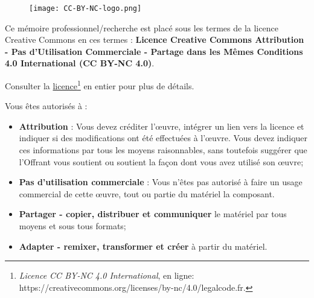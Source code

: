         \begin{figure}[H]
            \centering
            \texttt{[image: CC-BY-NC-logo.png]}
            \label{traitement}
        \end{figure}

    Ce mémoire professionnel/recherche est placé sous les termes de la licence Creative Commons en ces termes : \textbf{Licence Creative Commons Attribution - Pas d'Utilisation Commerciale - Partage dans les Mêmes Conditions 4.0 International (CC BY-NC 4.0)}.
\bigskip

    Consulter la \href{https://creativecommons.org/licenses/by-nc-sa/4.0/legalcode.fr}{licence\footnote{
\textit{Licence CC BY-NC 4.0 International}, en ligne: \url{https://creativecommons.org/licenses/by-nc/4.0/legalcode.fr}.}} en entier pour plus de détails. 
\bigskip

    Vous êtes autorisés à :
    \begin{itemize}
        \item \textbf{Attribution} : Vous devez créditer l'\oe uvre, intégrer un lien vers la licence et indiquer si des modifications ont été effectuées à l'\oe uvre. Vous devez indiquer ces informations par tous les moyens raisonnables, sans toutefois suggérer que l'Offrant vous soutient ou soutient la façon dont vous avez utilisé son \oe uvre;
        \item \textbf{Pas d'utilisation commerciale} : Vous n'êtes pas autorisé à faire un usage commercial de cette \oe uvre, tout ou partie du matériel la composant. 
        \item \textbf{Partager - copier, distribuer et communiquer} le matériel par tous moyens et sous tous formats;
        \item \textbf{Adapter - remixer, transformer et créer} à partir du matériel.
    \end{itemize}
\bigskip

\bigskip
\bigskip
\bigskip
\bigskip
\bigskip
\bigskip
\bigskip
\bigskip
\bigskip
\bigskip
\bigskip
\bigskip
\bigskip
\bigskip
\bigskip
\bigskip
\bigskip
\bigskip
\bigskip

\newpage
\thispagestyle{empty}